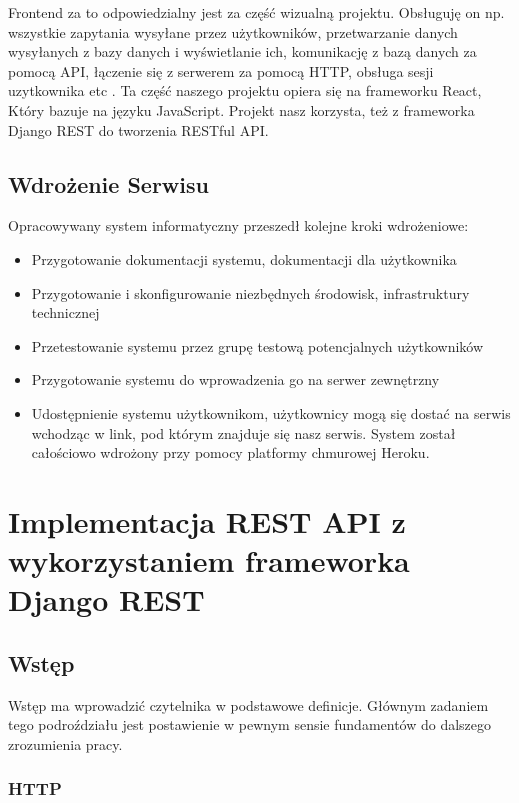 \documentclass[oneside,polski,logo,indent]{amuthesis}
\begin{document}
Frontend za to odpowiedzialny jest za część wizualną projektu. Obsługuję on np. wszystkie zapytania wysyłane przez użytkowników, przetwarzanie danych wysyłanych z bazy danych i wyświetlanie ich, komunikację z bazą danych za pomocą API, łączenie się z serwerem za pomocą HTTP, obsługa sesji uzytkownika etc . Ta część naszego projektu opiera się na frameworku React, Który bazuje na języku JavaScript. Projekt nasz korzysta, też z frameworka Django REST do tworzenia RESTful API.


\section{Wdrożenie Serwisu}

Opracowywany system informatyczny przeszedł kolejne kroki wdrożeniowe:
\begin{itemize}
\item Przygotowanie dokumentacji systemu, dokumentacji dla użytkownika
\item Przygotowanie i skonfigurowanie niezbędnych środowisk, infrastruktury technicznej
\item Przetestowanie systemu przez grupę testową potencjalnych użytkowników
\item Przygotowanie systemu do wprowadzenia go na serwer zewnętrzny
\item Udostępnienie systemu użytkownikom, użytkownicy mogą się dostać na serwis wchodząc w link, pod którym znajduje się nasz serwis. System został całościowo wdrożony przy pomocy platformy chmurowej Heroku.
\end{itemize}

\chapter{Implementacja REST API z wykorzystaniem frameworka Django REST}

\section{Wstęp}
Wstęp ma wprowadzić czytelnika w podstawowe definicje. Głównym zadaniem tego podroździału jest postawienie w pewnym sensie fundamentów do dalszego zrozumienia pracy. 

\begin{center}
\subsection{HTTP}
\end{center}
\end{document}

